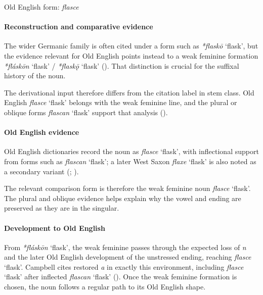 \documentclass[
  british,
  a4paper,
]{article}
\providecommand{\Recon}[1]{\emph{*#1}}
\begin{document}
Old English form: \emph{flasce}

\paragraph{Reconstruction and comparative
evidence}\label{reconstruction-and-comparative-evidence-88}

The wider Germanic family is often cited under a form such as
\Recon{flaskō} `flask', but the evidence relevant for Old English points
instead to a weak feminine formation \Recon{fláskōn} `flask' /
\Recon{flaskǭ} `flask' (). That
distinction is crucial for the suffixal history of the noun.

The derivational input therefore differs from the citation label in stem
class. Old English {\emph{flasce}} `flask' belongs with the weak
feminine line, and the plural or oblique forms {\emph{flascan}} `flask'
support that analysis ().

\paragraph{Old English evidence}\label{old-english-evidence-88}

Old English dictionaries record the noun as {\emph{flasce}} `flask',
with inflectional support from forms such as {\emph{flascan}} `flask'; a
later West Saxon {\emph{flaxe}} `flask' is also noted as a secondary
variant (; ).

The relevant comparison form is therefore the weak feminine noun
{\emph{flasce}} `flask'. The plural and oblique evidence helps explain
why the vowel and ending are preserved as they are in the singular.

\paragraph{Development to Old
English}\label{development-to-old-english-88}

From \Recon{fláskōn} `flask', the weak feminine passes through the
expected loss of \emph{n} and the later Old English development of the
unstressed ending, reaching {\emph{flasce}} `flask'. Campbell cites
restored \emph{a} in exactly this environment, including {\emph{flasce}}
`flask' after inflected {\emph{flascan}} `flask'
(). Once the weak
feminine formation is chosen, the noun follows a regular path to its Old
English shape.
\end{document}
